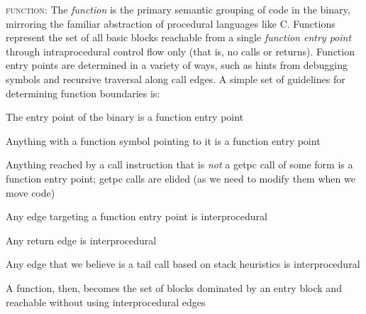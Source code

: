 \begin{itemize}[leftmargin=0pt,label=$\circ$]
{\item {\scshape function}: The \emph{function} is the primary
semantic grouping of code in the binary, mirroring the familiar
abstraction of procedural languages like C. Functions represent the
set of all basic blocks reachable from a single \emph{function entry point}
through intraprocedural control flow only (that is, no calls or
returns). Function entry points are determined in a variety of ways,
such as hints from debugging symbols and recursive traversal along
call edges. A simple set of guidelines for determining function boundaries is:
\begin{itemize}[label=$\circ$]
{\item The entry point of the binary is a function entry point}
{\item Anything with a function symbol pointing to it is a function entry point }
{\item Anything reached by a call instruction that is \emph{not} a getpc call of some form is a function entry point; getpc calls are elided (as we need to modify them when we move code)}
{\item Any edge targeting a function entry point is interprocedural}
{\item Any return edge is interprocedural}
{\item Any edge that we believe is a tail call based on stack heuristics is interprocedural}
{\item A function, then, becomes the set of blocks dominated by an entry block and reachable without using interprocedural edges}
\end{itemize}
 }

\end{itemize}

